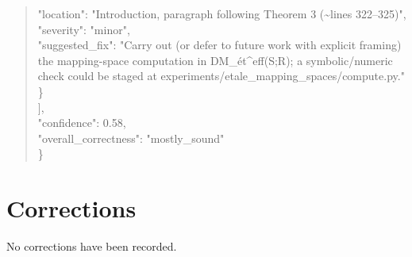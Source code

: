 \documentclass[11pt]{article}
\begin{document}
\begin{quote}
      "location": "Introduction, paragraph following Theorem 3 (\~{}lines 322--325)",\\
      "severity": "minor",\\
      "suggested\_fix": "Carry out (or defer to future work with explicit framing) the mapping-space computation in DM\_ét\^{}eff(S;R); a symbolic/numeric check could be staged at experiments/etale\_mapping\_spaces/compute.py."\\
    \}\\
  ],\\
  "confidence": 0.58,\\
  "overall\_correctness": "mostly\_sound"\\
\}\\
\end{quote}

\section*{Corrections}
No corrections have been recorded.
\end{document}
